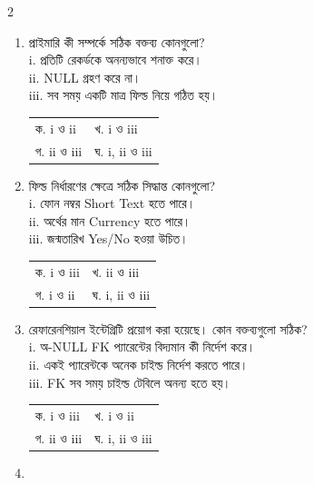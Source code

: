 \begin{multicols}{2}
\begin{enumerate}[resume]
\item \begin{minipage}[t]{\linewidth}
প্রাইমারি কী সম্পর্কে সঠিক বক্তব্য কোনগুলো?\\ i. প্রতিটি রেকর্ডকে অনন্যভাবে শনাক্ত করে।\\ ii. NULL গ্রহণ করে না।\\ iii. সব সময় একটি মাত্র ফিল্ড নিয়ে গঠিত হয়।
\par
\begin{tabularx}{\linewidth}{@{}X X@{}}
ক. i ও ii & খ. i ও iii \\
গ. ii ও iii & ঘ. i, ii ও iii \\
\end{tabularx}
\end{minipage}
\vspace{1pt}
\item \begin{minipage}[t]{\linewidth}
ফিল্ড নির্ধারণের ক্ষেত্রে সঠিক সিদ্ধান্ত কোনগুলো?\\ i. ফোন নম্বর Short Text হতে পারে।\\ ii. অর্থের মান Currency হতে পারে।\\ iii. জন্মতারিখ Yes/No হওয়া উচিত।
\par
\begin{tabularx}{\linewidth}{@{}X X@{}}
ক. i ও iii & খ. ii ও iii \\
গ. i ও ii & ঘ. i, ii ও iii \\
\end{tabularx}
\end{minipage}
\vspace{1pt}
\item \begin{minipage}[t]{\linewidth}
রেফারেনশিয়াল ইন্টেগ্রিটি প্রয়োগ করা হয়েছে। কোন বক্তব্যগুলো সঠিক?\\ i. অ-NULL FK প্যারেন্টের বিদ্যমান কী নির্দেশ করে।\\ ii. একই প্যারেন্টকে অনেক চাইল্ড নির্দেশ করতে পারে।\\ iii. FK সব সময় চাইল্ড টেবিলে অনন্য হতে হয়।
\par
\begin{tabularx}{\linewidth}{@{}X X@{}}
ক. i ও iii & খ. i ও ii \\
গ. ii ও iii & ঘ. i, ii ও iii \\
\end{tabularx}
\end{minipage}
\vspace{1pt}
\item \begin{minipage}[t]{\linewidth}

\end{minipage}
\end{enumerate}
\end{multicols}
